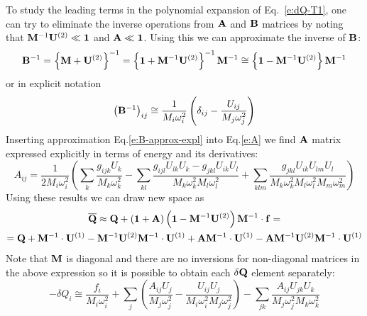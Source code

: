 \documentclass[a4paper,titlepage,twoside,fleqn,12pt]{book}
\begin{document}
\begin{refsection}
To study the leading terms in the polynomial expansion of Eq.~\eqref{e:dQ-T1}, 
one can try to eliminate the inverse operations from ${\bf A}$ and ${\bf B}$ matrices by noting that
${\bf M}^{-1} {\bf U}^{(2)} \ll {\bf 1}$ and ${\bf A} \ll {\bf 1}$. 
Using this we can approximate the inverse of ${\bf B}$:
%
\begin{equation}\label{e:B-approx}
{\bf B}^{-1} = \left\{ {\bf M} + {\bf U}^{(2)} \right\}^{-1} 
= \left\{ {\bf 1} + {\bf M}^{-1}{\bf U}^{(2)} \right\}^{-1}{\bf M}^{-1}
\cong \left\{ {\bf 1} - {\bf M}^{-1}{\bf U}^{(2)} \right\}{\bf M}^{-1}
\end{equation}
%
or in explicit notation
%
\begin{equation}\label{e:B-approx-expl}
\left( {\bf B}^{-1} \right)_{ij} \cong
\frac{1}{M_i\omega_i^2} \left( \delta_{ij} - \frac{U_{ij}}{M_j\omega_j^2} \right)
\end{equation}
%
Inserting approximation Eq.\eqref{e:B-approx-expl} into Eq.\eqref{e:A} we find
${\bf A}$ matrix expressed explicitly in terms of energy and its derivatives:
%
\begin{equation}\label{e:A-approx-expl}
A_{ij} = \frac{1}{2M_i\omega_i^2} 
\left(
     \sum_k \frac{g_{ijk}U_k}{M_k\omega_k^2} -
     \sum_{kl} \frac{ g_{ijl} U_{lk} U_k - g_{jkl} U_{ik} U_l }
                    {M_k\omega_k^2 M_l\omega_l^2} +
     \sum_{klm} \frac{ g_{jkl} U_{ik} U_{lm} U_l }
                     {M_k\omega_k^2 M_l\omega_l^2 M_m\omega_m^2}
\right)
\end{equation}
%
Using these results we can draw new space as
\begin{multline}\label{e:Q-new-T2-approx}
{\bf \overline{Q}} \approx {\bf Q} + \left( {\bf 1} + {\bf A} \right) \left( {\bf 1} - {\bf M}^{-1}{\bf U}^{(2)} \right){\bf M}^{-1} \cdot {\bf f}
= \\
={\bf Q} + {\bf M}^{-1} \cdot {\bf U}^{(1)} - {\bf M}^{-1}{\bf U}^{(2)}{\bf M}^{-1}\cdot{\bf U}^{(1)}
+ {\bf A}{\bf M}^{-1}\cdot{\bf U}^{(1)} - {\bf A}{\bf M}^{-1}{\bf U}^{(2)}{\bf M}^{-1}\cdot{\bf U}^{(1)}
\end{multline}
%
Note that ${\bf M}$ is diagonal and there are no inversions 
for non-diagonal matrices in the above expression
so it is possible to obtain each $\delta{\bf Q}$
element separately:
%
\begin{equation}\label{e:dQ-approx-T1-expl}
-\delta Q_i \cong \frac{f_i}{M_i\omega_i^2} + 
  \sum_j \left( 
         \frac{ A_{ij}U_j }{M_j\omega_j^2} - 
         \frac{ U_{ij}U_j }{M_i\omega_i^2 M_j\omega_j^2}
         \right) -
  \sum_{jk} \frac{ A_{ij} U_{jk} U_k }{M_j\omega_j^2 M_k\omega_k^2}

\end{equation}
\end{refsection}
\end{document}
